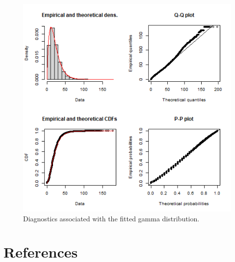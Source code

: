 \documentclass[]{elsarticle} %
\begin{document}
\begin{figure}
\includegraphics[width=1\linewidth]{images/impedance_function} \caption{\label{fig:impedance-function-plot}Diagnostics associated with the fitted gamma distribution.}\label{fig:plot-impedance-function}
\end{figure}

\hypertarget{references}{%
\section*{References}\label{references}}
\end{document}
